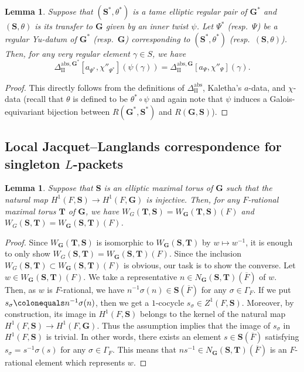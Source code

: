 \documentclass{amsart}
\newcommand{\abs}{\mathrm{abs}}
\newcommand{\bfT}{\mathbf{T}}
\newcommand{\bfG}{\mathbf{G}}
\newcommand{\bfS}{\mathbf{S}}
\newcommand{\II}{\mathrm{II}}
\theoremstyle{plain}
\newtheorem{lem}[thm]{Lemma}
\theoremstyle{definition}
\theoremstyle{remark}
\theoremstyle{theorem}
\begin{document}
\begin{lem}\label{lem:tran-transfer}
Suppose that $(\bfS^{\ast},\theta^{\ast})$ is a tame elliptic regular pair of $\bfG^{\ast}$ and $(\bfS,\theta)$ is its transfer to $\bfG$ given by an inner twist $\psi$.
Let $\Psi^{\ast}$ (resp.\ $\Psi$) be a regular Yu-datum of $\bfG^{\ast}$ (resp.\ $\bfG$) corresponding to $(\bfS^{\ast},\theta^{\ast})$ (resp.\ $(\bfS,\theta)$).
Then, for any very regular element $\gamma\in S$, we have
\[
\Delta_{\II}^{\abs,\bfG^{\ast}}[a_{\Psi^{\ast}},\chi''_{\Psi^{\ast}}](\psi(\gamma))
=
\Delta_{\II}^{\abs,\bfG}[a_{\Psi},\chi''_{\Psi}](\gamma).
\]
\end{lem}

\begin{proof}
This directly follows from the definitions of $\Delta_{\II}^{\abs}$, Kaletha's $a$-data, and $\chi$-data (recall that $\theta$ is defined to be $\theta^{\ast}\circ\psi$ and again note that $\psi$ induces a Galois-equivariant bijection between $R(\bfG^{\ast},\bfS^{\ast})$ and $R(\bfG,\bfS)$).
\end{proof}


\subsection{Local Jacquet--Langlands correspondence for singleton $L$-packets}\label{subsec:LJLC-1}

\begin{lem}\label{lem:Weyl-eq}
Suppose that $\bfS$ is an elliptic maximal torus of $\bfG$ such that the natural map $H^{1}(F,\bfS)\rightarrow H^{1}(F,\bfG)$ is injective.
Then, for any $F$-rational maximal torus $\bfT$ of $\bfG$, we have $W_{G}(\bfT,\bfS)=W_{\bfG}(\bfT,\bfS)(F)$ and $W_{G}(\bfS,\bfT)=W_{\bfG}(\bfS,\bfT)(F)$.
\end{lem}

\begin{proof}
Since $W_{\bfG}(\bfT,\bfS)$ is isomorphic to $W_{\bfG}(\bfS,\bfT)$ by $w\mapsto w^{-1}$, it is enough to only show $W_{G}(\bfS,\bfT)=W_{\bfG}(\bfS,\bfT)(F)$.
Since the inclusion $W_{G}(\bfS,\bfT)\subset W_{\bfG}(\bfS,\bfT)(F)$ is obvious, our task is to show the converse.
Let $w\in W_{\bfG}(\bfS,\bfT)(F)$.
We take a representative $n\in N_{\bfG}(\bfS,\bfT)(\overline{F})$ of $w$.
Then, as $w$ is $F$-rational, we have $n^{-1}\sigma(n)\in\bfS(\overline{F})$ for any $\sigma\in\Gamma_{F}$.
If we put $s_{\sigma}\colonequals n^{-1}\sigma(n)$, then we get a $1$-cocycle $s_{\sigma}\in Z^{1}(F,\bfS)$.
Moreover, by construction, its image in $H^{1}(F,\bfS)$ belongs to the kernel of the natural map $H^{1}(F,\bfS)\rightarrow H^{1}(F,\bfG)$.
Thus the assumption implies that the image of $s_{\sigma}$ in $H^{1}(F,\bfS)$ is trivial.
In other words, there exists an element $s\in\bfS(\overline{F})$ satisfying $s_{\sigma}=s^{-1}\sigma(s)$ for any $\sigma\in\Gamma_{F}$.
This means that $ns^{-1}\in N_{\bfG}(\bfS,\bfT)(\overline{F})$ is an $F$-rational element which represents $w$.
\end{proof}
\end{document}
